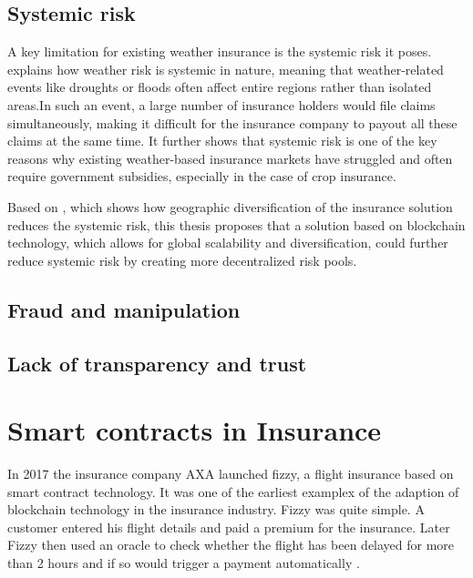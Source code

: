 \subsection{Systemic risk}

A key limitation for existing weather insurance is the systemic risk it poses. \autocite{xu2010systemic} explains how weather risk is systemic in nature, meaning that weather-related events like droughts or floods often affect entire regions rather than isolated areas.In such an event, a large number of insurance holders would file claims simultaneously, making it difficult for the insurance company to payout all these claims at the same time. It further shows that systemic risk is one of the key reasons why existing weather-based insurance markets have struggled and often require government subsidies, especially in the case of crop insurance. 

Based on \autocite{salgueiro2021diversification}, which shows how geographic diversification of the insurance solution reduces the systemic risk, this thesis proposes that a solution based on blockchain technology, which allows for global scalability and diversification, could further reduce systemic risk by creating more decentralized risk pools.

\subsection{Fraud and manipulation}



\subsection{Lack of transparency and trust}



\section{Smart contracts in Insurance}\label{section:smart_contracts_insurance}

In 2017 the insurance company AXA launched fizzy, a flight insurance based on smart contract technology. It was one of the earliest examplex of the adaption of blockchain technology in the insurance industry. Fizzy was quite simple. A customer entered his flight details and paid a premium for the insurance. Later Fizzy then used an oracle to check whether the flight has been delayed for more than 2 hours and if so would trigger a payment automatically \autocite{hoffmann2021double}.

